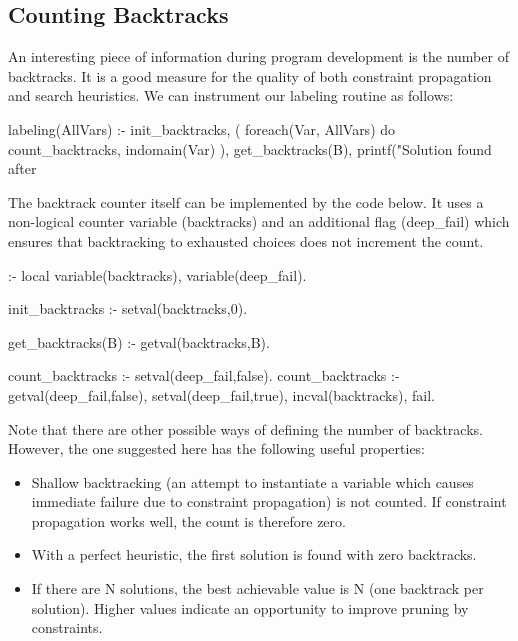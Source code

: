 \subsection{Counting Backtracks}


\label{countbt}
An interesting piece of information during program development is the
number of backtracks. It is a good measure for the quality of
both constraint propagation and search heuristics.
We can instrument our labeling routine as follows:
\begin{code}
labeling(AllVars) :-
        init_backtracks,
        ( foreach(Var, AllVars) do
            count_backtracks,       %
            indomain(Var)
        ),
        get_backtracks(B),
        printf("Solution found after %
\end{code}
The backtrack counter itself can be implemented by the code below.
It uses a non-logical counter variable (backtracks) and an additional
flag (deep\_fail) which ensures that backtracking to exhausted choices
does not increment the count.
\begin{code}
:- local variable(backtracks), variable(deep_fail).

init_backtracks :-
        setval(backtracks,0).

get_backtracks(B) :-
        getval(backtracks,B).

count_backtracks :-
        setval(deep_fail,false).
count_backtracks :-
        getval(deep_fail,false),        %
        setval(deep_fail,true),
        incval(backtracks),
        fail.
\end{code}
Note that there are other possible ways of defining the number of backtracks.
However, the one suggested here has the following useful properties:
\begin{itemize}
\item Shallow backtracking (an attempt to instantiate a variable which
    causes immediate failure due to constraint propagation) is not counted.
    If constraint propagation works well, the count is therefore zero.
\item With a perfect heuristic, the first solution is found with zero
    backtracks.
\item If there are N solutions, the best achievable value is N (one backtrack
    per solution). Higher values indicate an opportunity to improve pruning
    by constraints.
\end{itemize}

